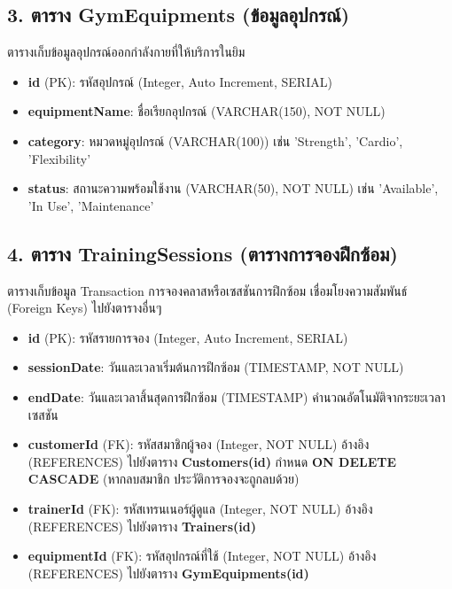 \subsection{3. ตาราง GymEquipments (ข้อมูลอุปกรณ์)}
ตารางเก็บข้อมูลอุปกรณ์ออกกำลังกายที่ให้บริการในยิม
\begin{itemize}
    \item \textbf{id} (PK): รหัสอุปกรณ์ (Integer, Auto Increment, SERIAL)
    \item \textbf{equipmentName}: ชื่อเรียกอุปกรณ์ (VARCHAR(150), NOT NULL)
    \item \textbf{category}: หมวดหมู่อุปกรณ์ (VARCHAR(100)) เช่น 'Strength', 'Cardio', 'Flexibility'
    \item \textbf{status}: สถานะความพร้อมใช้งาน (VARCHAR(50), NOT NULL) เช่น 'Available', 'In Use', 'Maintenance'
\end{itemize}

\subsection{4. ตาราง TrainingSessions (ตารางการจองฝึกซ้อม)}
ตารางเก็บข้อมูล Transaction การจองคลาสหรือเซสชันการฝึกซ้อม เชื่อมโยงความสัมพันธ์ (Foreign Keys) ไปยังตารางอื่นๆ
\begin{itemize}
    \item \textbf{id} (PK): รหัสรายการจอง (Integer, Auto Increment, SERIAL)
    \item \textbf{sessionDate}: วันและเวลาเริ่มต้นการฝึกซ้อม (TIMESTAMP, NOT NULL)
    \item \textbf{endDate}: วันและเวลาสิ้นสุดการฝึกซ้อม (TIMESTAMP) คำนวณอัตโนมัติจากระยะเวลาเซสชัน
    \item \textbf{customerId} (FK): รหัสสมาชิกผู้จอง (Integer, NOT NULL) \newline
    อ้างอิง (REFERENCES) ไปยังตาราง \textbf{Customers(id)} \newline
    กำหนด \textbf{ON DELETE CASCADE} (หากลบสมาชิก ประวัติการจองจะถูกลบด้วย)
    \item \textbf{trainerId} (FK): รหัสเทรนเนอร์ผู้ดูแล (Integer, NOT NULL) \newline
    อ้างอิง (REFERENCES) ไปยังตาราง \textbf{Trainers(id)}
    \item \textbf{equipmentId} (FK): รหัสอุปกรณ์ที่ใช้ (Integer, NOT NULL) \newline
    อ้างอิง (REFERENCES) ไปยังตาราง \textbf{GymEquipments(id)}
\end{itemize}
